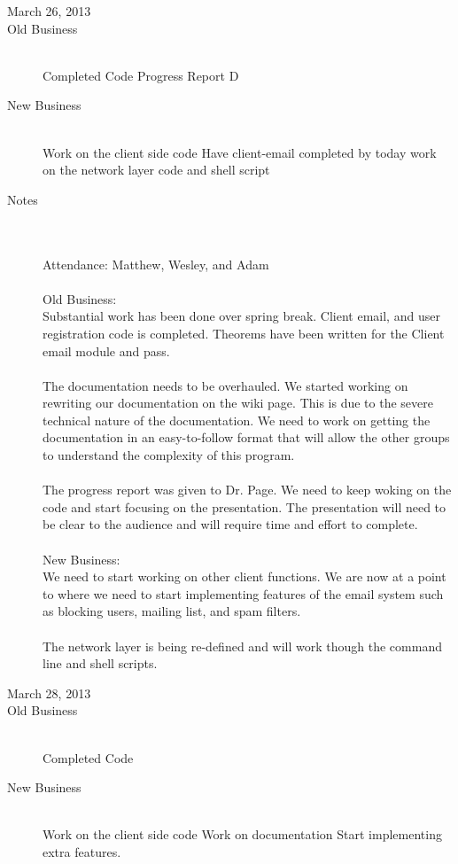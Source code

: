 \documentclass[11pt, letterpaper]{report}
\begin{document}
\begin{description}
\newpage
\item[\Large March 26, 2013]
\hypertarget{March 26, 2013} {}
\item[Old Business] \hfill \\
\subitem Completed Code
\subitem Progress Report D
\item[New Business] \hfill \\
\subitem Work on the client side code
\subsubitem Have client-email completed by today
\subitem work on the network layer code and shell script

\item[Notes] \hfill \\ \hfill \\
Attendance:  Matthew, Wesley, and Adam\\ \\
Old Business: \\
Substantial work has been done over spring break. Client email, and user registration code is completed. Theorems have been written for the Client email module and pass. \\ \\
The documentation needs to be overhauled. We started working on rewriting our documentation on the wiki page. This is due to the severe technical nature of the documentation. We need to work on getting the documentation in an easy-to-follow format that will allow the other groups to understand the complexity of this program. \\ \\
The progress report was given to Dr. Page. We need to keep woking on the code and start focusing on the presentation. The presentation will need to be clear to the audience and will require time and effort to complete. 
\\ \\
New Business:\\
We need to start working on other client functions. We are now at a point to where we need to start implementing features of the email system such as blocking users, mailing list, and spam filters. \\ \\
The network layer is being re-defined and will work though the command line and shell scripts.



\newpage
\item[\Large March 28, 2013]
\hypertarget{March 28, 2013} {}
\item[Old Business] \hfill \\
\subitem Completed Code
\item[New Business] \hfill \\
\subitem Work on the client side code
\subitem Work on documentation
\subitem Start implementing extra features.


\end{description}
\end{document}
